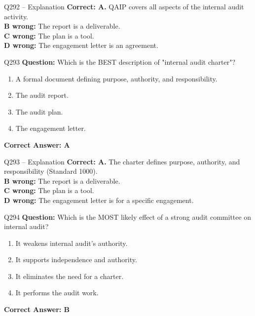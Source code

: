 \documentclass[aspectratio=169,10pt]{beamer}
\begin{document}
	\begin{frame}[t]{Q292 -- Explanation}
		\small
		\textbf{Correct: A.} QAIP covers all aspects of the internal audit activity. \\[4pt]
		\textbf{B wrong:} The report is a deliverable. \\[2pt]
		\textbf{C wrong:} The plan is a tool. \\[2pt]
		\textbf{D wrong:} The engagement letter is an agreement.
	\end{frame}
	
	\begin{frame}[t]{Q293}
		\small
		\textbf{Question:} Which is the BEST description of "internal audit charter"?
		\begin{enumerate}[label=\Alph*.,itemsep=1pt,topsep=2pt]
			\item A formal document defining purpose, authority, and responsibility.
			\item The audit report.
			\item The audit plan.
			\item The engagement letter.
		\end{enumerate}
		\vspace{4pt}
		\textbf{Correct Answer: A}
	\end{frame}
	
	\begin{frame}[t]{Q293 -- Explanation}
		\small
		\textbf{Correct: A.} The charter defines purpose, authority, and responsibility (Standard 1000). \\[4pt]
		\textbf{B wrong:} The report is a deliverable. \\[2pt]
		\textbf{C wrong:} The plan is a tool. \\[2pt]
		\textbf{D wrong:} The engagement letter is for a specific engagement.
	\end{frame}
	
	\begin{frame}[t]{Q294}
		\small
		\textbf{Question:} Which is the MOST likely effect of a strong audit committee on internal audit?
		\begin{enumerate}[label=\Alph*.,itemsep=1pt,topsep=2pt]
			\item It weakens internal audit's authority.
			\item It supports independence and authority.
			\item It eliminates the need for a charter.
			\item It performs the audit work.
		\end{enumerate}
		\vspace{4pt}
		\textbf{Correct Answer: B}
	\end{frame}
	
\end{document}
